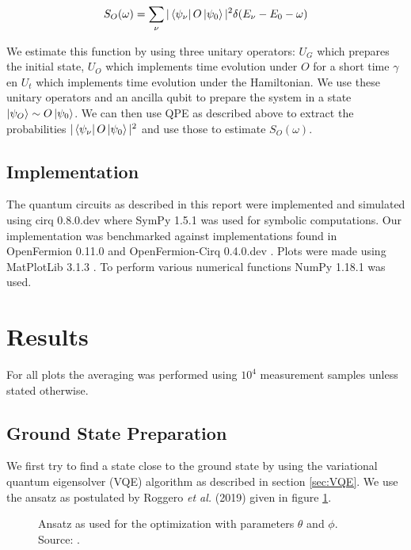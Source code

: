 \documentclass[10 pt, a4paper]{article}
\begin{document}
\begin{align*}
S_O (\omega) = \sum_\nu |\bra{\psi_\nu} O \ket{\psi_0}|^2 \delta (E_\nu - E_0 - \omega)
\end{align*}

We estimate this function by using three unitary operators: $U_G$ which prepares the initial state, $U_O$ which implements time evolution under $O$ for a short time $\gamma$ en $U_t$ which implements time evolution under the Hamiltonian. We use these unitary operators and an ancilla qubit to prepare the system in a state $\ket{\psi_O} \sim O \ket{\psi_0}$. We can then use QPE as described above to extract the probabilities $|\bra{\psi_\nu} O \ket{\psi_0}|^2$ and use those to estimate $S_O (\omega)$.

\subsection{Implementation}

The quantum circuits as described in this report were implemented and simulated using cirq 0.8.0.dev \cite{cirq} where SymPy 1.5.1 \cite{sympy} was used for symbolic computations. Our implementation was benchmarked against implementations found in OpenFermion 0.11.0 and OpenFermion-Cirq 0.4.0.dev \cite{openfermion}. Plots were made using MatPlotLib 3.1.3 \cite{matplotlib}. To perform various numerical functions NumPy 1.18.1 \cite{numpy} was used.


\section{Results}

For all plots the averaging was performed using $10^4$ measurement samples unless stated otherwise.

\subsection{Ground State Preparation}

We first try to find a state close to the ground state by using the variational quantum eigensolver (VQE) algorithm as described in section \ref{sec:VQE}. We use the ansatz as postulated by Roggero \textit{et al.} (2019) \cite{neutscat} given in figure \ref{fig:ansatz}.

\begin{figure}[H]
\centering
\caption{Ansatz as used for the optimization with parameters $\theta$ and $\phi$. Source: \cite{neutscat}.} \label{fig:ansatz}
\end{figure}
\end{document}

